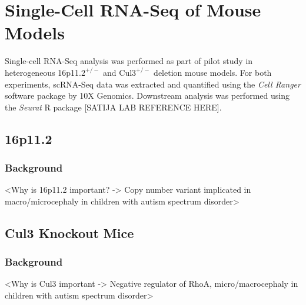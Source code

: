 \chapter{Single-Cell RNA-Seq of Mouse Models}

Single-cell RNA-Seq analysis was performed as part of pilot study in heterogeneous 16p11.$2^{+/-}$ and Cul$3^{+/-}$ deletion mouse models. For both experiments, scRNA-Seq data was extracted and quantified using the \textit{Cell Ranger} software package by 10X Genomics. Downstream analysis was performed using the \textit{Seurat} R package [SATIJA LAB REFERENCE HERE].

\section{16p11.2}

\subsection{Background}
<Why is 16p11.2 important? -> Copy number variant implicated in macro/microcephaly in children with autism spectrum disorder>

\section{Cul3 Knockout Mice}

\subsection{Background}
<Why is Cul3 important -> Negative regulator of RhoA, micro/macrocephaly in children with autism spectrum disorder>